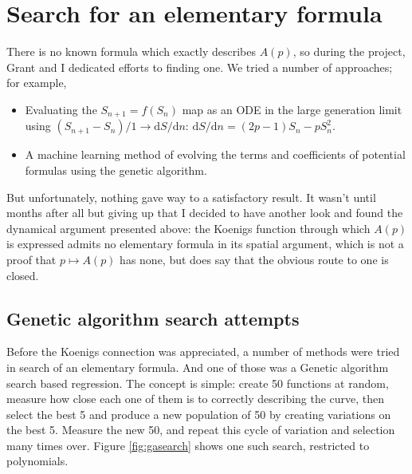 \section{Search for an elementary formula}
\label{sec:search}

There is no known formula which exactly describes $A(p)$, so during the project, Grant and I dedicated efforts
to finding one. We tried a number of approaches; for example, 

\begin{itemize}
    \item Evaluating the $S_{n+1} = f(S_n)$ map as an ODE in the large generation limit using $(S_{n+1} - S_n)/1 \to \mathrm{d}S / \mathrm{d} n$: $\mathrm{d}S / \mathrm{d} n = (2p-1)S_n - pS_{n}^2$.
    \item A machine learning method of evolving the terms and coefficients of potential formulas using the genetic algorithm.
\end{itemize}
But unfortunately, nothing gave way to a satisfactory result. It wasn't until months after all but giving up that I decided to have another look and found the dynamical argument presented above: the Koenigs function through which $A(p)$ is expressed admits no elementary formula in its spatial argument, which is not a proof that $p\mapsto A(p)$ has none, but does say that the obvious route to one is closed.

\subsection{Genetic algorithm search attempts}

Before the Koenigs connection was appreciated, a number of methods were tried in search of an elementary formula. 
And one of those was a Genetic algorithm search based regression. The concept is simple: create
50 functions at random, measure how close each one of them is to correctly describing the curve,
then select the best 5 and produce a new population of 50 by creating variations on the best 5. 
Measure the new 50, and repeat this cycle of variation and selection many times over.
Figure \ref{fig:gasearch} shows one such search, restricted to polynomials.

